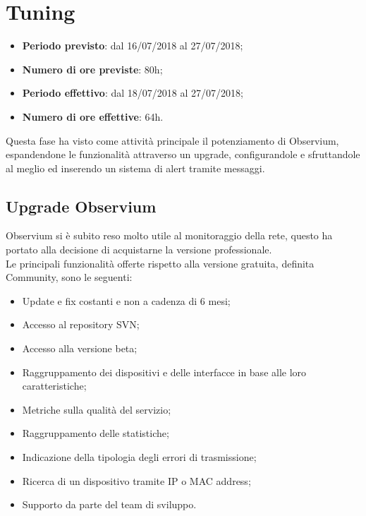 \documentclass[Realizzazione.tex]{subfiles}
\begin{document}
\section{Tuning}
\begin{itemize}
	\item \textbf{Periodo previsto}: dal 16/07/2018 al 27/07/2018;
	\item \textbf{Numero di ore previste}: 80h;
	\item \textbf{Periodo effettivo}: dal 18/07/2018 al 27/07/2018;
	\item \textbf{Numero di ore effettive}: 64h.
\end{itemize}
Questa fase ha visto come attività principale il potenziamento di Observium, espandendone le funzionalità attraverso un upgrade, configurandole e sfruttandole al meglio ed inserendo un sistema di alert tramite messaggi.

\subsection{Upgrade Observium}
Observium si è subito reso molto utile al monitoraggio della rete, questo ha portato alla decisione di acquistarne la versione professionale. \\
Le principali funzionalità offerte rispetto alla versione gratuita, definita Community, sono le seguenti:
\begin{itemize}
	\item Update e fix costanti e non a cadenza di 6 mesi;
	\item Accesso al repository SVN;
	\item Accesso alla versione beta;
	\item Raggruppamento dei dispositivi e delle interfacce in base alle loro caratteristiche;
	\item Metriche sulla qualità del servizio;
	\item Raggruppamento delle statistiche;
	\item Indicazione della tipologia degli errori di trasmissione;
	\item Ricerca di un dispositivo tramite IP o MAC address;
	\item Supporto da parte del team di sviluppo.
\end{itemize}
\end{document}
